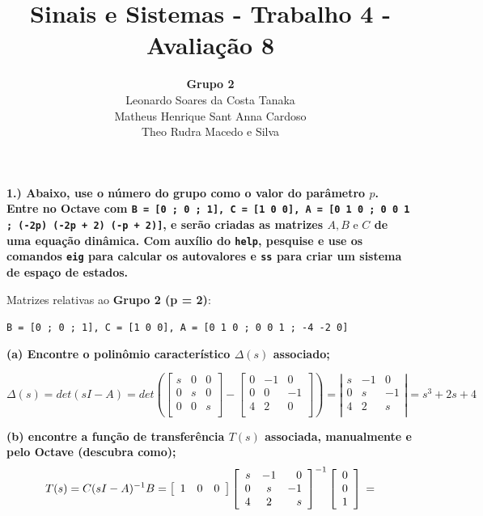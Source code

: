 \documentclass[11pt]{article}
\title{Sinais e Sistemas - Trabalho 4 - Avaliação 8}
\author{
    \textbf{Grupo 2}\\
    Leonardo Soares da Costa Tanaka\\
    Matheus Henrique Sant Anna Cardoso\\
    Theo Rudra Macedo e Silva
}
\date{}
\begin{document}
\maketitle
\thispagestyle{capa}
\newpage

\textbf{1.) Abaixo, use o número do grupo como o valor do parâmetro $p$. Entre no Octave com \texttt{B = [0 ; 0 ; 1], C = [1 0 0], A = [0 1 0 ; 0 0 1 ; (-2p) (-2p + 2) (-p + 2)]}, e serão criadas as matrizes $A, B \text{ e } C$ de uma equação dinâmica. Com auxílio do \texttt{help}, pesquise e use os comandos \texttt{eig} para calcular os autovalores e \texttt{ss} para criar um sistema de espaço de estados.}

Matrizes relativas ao \textbf{Grupo 2 (p = 2)}:

\texttt{B = [0 ; 0 ; 1], C = [1 0 0], A = [0 1 0 ; 0 0 1 ; -4 -2 0]}

\textbf{(a) Encontre o polinômio característico $\Delta(s)$ associado;}

\[
\Delta(s) = det(sI - A) = det\left(
\left[ {\begin{array}{ccc}
  s & 0 & 0 \\
  0 & s & 0 \\
  0 & 0 & s \\
\end{array} } \right]
-
\left[ {\begin{array}{ccc}
    0 & -1 & 0 \\
    0 & 0 & -1 \\
    4 & 2 & 0 \\
  \end{array} } \right]
  \right)
  =
  \left| \begin{array}{rcr}
    s & -1  & 0 \\ 
    0 & s & -1 \\
    4 & 2  & s \\
  \end{array}
  \right|
  = s^3 + 2s + 4
\]

\textbf{(b) encontre a função de transferência $T(s)$ associada, manualmente e pelo Octave (descubra como);}
\[
  T(s) = C(sI - A)^{-1}B =
  \left[ {\begin{array}{ccc}
    1 & 0 & 0 \\
  \end{array} } \right]
  \left[ \begin{array}{rcr}
    s & -1  & 0 \\ 
    0 & s & -1 \\
    4 & 2  & s \\
  \end{array} \right]^{-1}
  \left[ {\begin{array}{c}
    0 \\
    0 \\
    1 \\
  \end{array} } \right]
  \\
=
\] 
 
\end{document}
